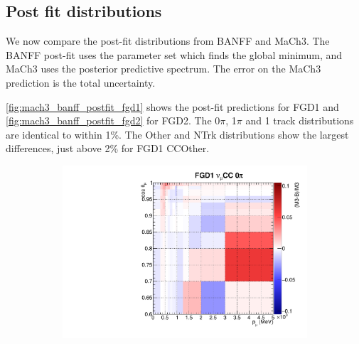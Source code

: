 \subsection{Post fit distributions}
We now compare the post-fit \pmu distributions from BANFF and MaCh3. The BANFF post-fit uses the parameter set which finds the global minimum, and MaCh3 uses the posterior predictive spectrum. The error on the MaCh3 prediction is the total uncertainty.

\autoref{fig:mach3_banff_postfit_fgd1} shows the post-fit predictions for FGD1 and \autoref{fig:mach3_banff_postfit_fgd2} for FGD2. The 0$\pi$, 1$\pi$ and 1 track distributions are identical to within 1\%. The Other and NTrk distributions show the largest differences, just above 2\% for FGD1 CCOther.
\begin{figure}
	\begin{subfigure}[t]{0.10\textwidth}
		\includegraphics[width=\textwidth, trim={0mm 0mm 0mm 0mm}, clip, page=2]{figures/mach3/banff/postfit_comp}
	\end{subfigure}
	

\end{figure}
